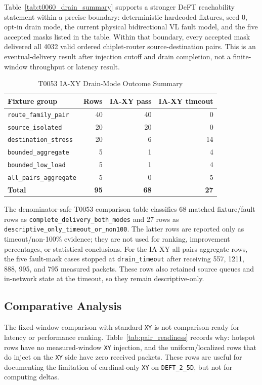 \documentclass[conference]{IEEEtran}
\begin{document}
Table~\ref{tab:t0060_drain_summary} supports a stronger DeFT reachability statement within a precise boundary: deterministic hardcoded fixtures, seed 0, opt-in drain mode, the current physical bidirectional VL fault model, and the five accepted masks listed in the table. Within that boundary, every accepted mask delivered all 4032 valid ordered chiplet-router source-destination pairs. This is an eventual-delivery result after injection cutoff and drain completion, not a finite-window throughput or latency result.

\begin{table}[t]
\centering
\caption{T0053 IA-XY Drain-Mode Outcome Summary}
\label{tab:t0053_iaxy_summary}
\scriptsize
\begin{tabular}{@{}lrrr@{}}
\toprule
\textbf{Fixture group} & \textbf{Rows} & \textbf{IA-XY pass} & \textbf{IA-XY timeout} \\
\midrule
\texttt{route\_family\_pair} & 40 & 40 & 0 \\
\texttt{source\_isolated} & 20 & 20 & 0 \\
\texttt{destination\_stress} & 20 & 6 & 14 \\
\texttt{bounded\_aggregate} & 5 & 1 & 4 \\
\texttt{bounded\_low\_load} & 5 & 1 & 4 \\
\texttt{all\_pairs\_aggregate} & 5 & 0 & 5 \\
\textbf{Total} & \textbf{95} & \textbf{68} & \textbf{27} \\
\bottomrule
\end{tabular}
\end{table}

The denominator-safe T0053 comparison table classifies 68 matched fixture/fault rows as \texttt{complete\_delivery\_both\_modes} and 27 rows as \texttt{descriptive\_only\_timeout\_or\_non100}. The latter rows are reported only as timeout/non-100\% evidence; they are not used for ranking, improvement percentages, or statistical conclusions. For the IA-XY all-pairs aggregate rows, the five fault-mask cases stopped at \texttt{drain\_timeout} after receiving 557, 1211, 888, 995, and 795 measured packets. These rows also retained source queues and in-network state at the timeout, so they remain descriptive-only.

\subsection{Comparative Analysis}

The fixed-window comparison with standard \texttt{XY} is not comparison-ready for latency or performance ranking. Table~\ref{tab:pair_readiness} records why: hotspot rows have no measured-window \texttt{XY} injection, and the uniform/localized rows that do inject on the \texttt{XY} side have zero received packets. These rows are useful for documenting the limitation of cardinal-only \texttt{XY} on \texttt{DEFT\_2\_5D}, but not for computing deltas.
\end{document}

